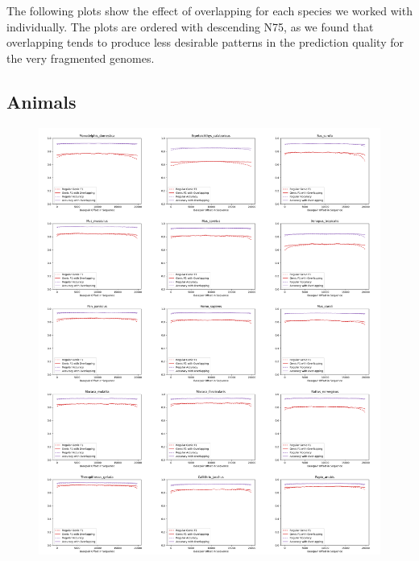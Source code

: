 \documentclass{article}
\begin{document}
The following plots show the effect of overlapping for each species we worked with individually. The plots are ordered with descending N75, as we found that overlapping tends to produce less desirable patterns in the prediction quality for the very fragmented genomes. 

\subsection{Animals}
\newpage

\begin{figure}[!h]
\centerline{\includegraphics[width=1.2\textwidth]{images/overlapping/montage_animals1}}
\end{figure}
\end{document}
